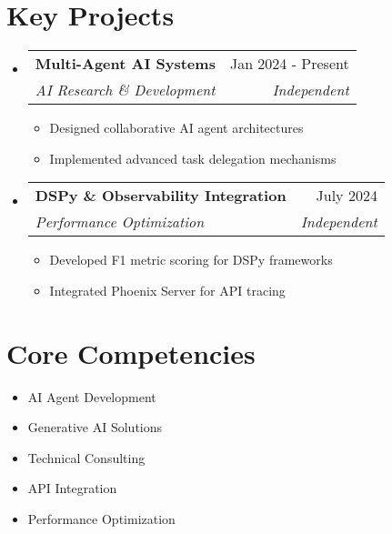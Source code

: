 \documentclass[11pt,a4paper]{article}
\makeatletter
\newcommand{\resumeItem}[1]{\item #1}
\newcommand{\resumeSubheading}[4]{
  \vspace{-2pt}\item
    \begin{tabular*}{0.97\textwidth}[t]{l@{\extracolsep{\fill}}r}
      \textbf{#1} & #2 \\
      \textit{\small#3} & \textit{\small #4} \\
    \end{tabular*}\vspace{-7pt}
}
\makeatother
\begin{document}
\section{Key Projects}
\begin{itemize}[leftmargin=*]
    \resumeSubheading
      {Multi-Agent AI Systems}{Jan 2024 - Present}
      {AI Research \& Development}{Independent}
      \begin{itemize}[leftmargin=*]
        \resumeItem{Designed collaborative AI agent architectures}
        \resumeItem{Implemented advanced task delegation mechanisms}
      \end{itemize}

    \resumeSubheading
      {DSPy \& Observability Integration}{July 2024}
      {Performance Optimization}{Independent}
      \begin{itemize}[leftmargin=*]
        \resumeItem{Developed F1 metric scoring for DSPy frameworks}
        \resumeItem{Integrated Phoenix Server for API tracing}
      \end{itemize}
\end{itemize}

\section{Core Competencies}
\begin{itemize}[leftmargin=*]
    \resumeItem{AI Agent Development}
    \resumeItem{Generative AI Solutions}
    \resumeItem{Technical Consulting}
    \resumeItem{API Integration}
    \resumeItem{Performance Optimization}
\end{itemize}
\end{document}
